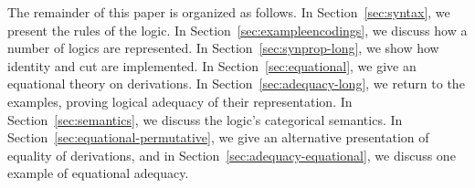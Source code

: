 
The remainder of this paper is organized as follows.  In
Section~\ref{sec:syntax}, we present the rules of the logic.  In
Section~\ref{sec:exampleencodings}, we discuss how a number of logics
are represented.  In Section~\ref{sec:synprop-long}, we show how
identity and cut are implemented.  In Section~\ref{sec:equational}, we
give an equational theory on derivations.  In
Section~\ref{sec:adequacy-long}, we return to the examples, proving
logical adequacy of their representation.  In
Section~\ref{sec:semantics}, we discuss the logic's categorical
semantics.  In Section~\ref{sec:equational-permutative}, we give an
alternative presentation of equality of derivations, and in
Section~\ref{sec:adequacy-equational}, we discuss one example of
equational adequacy.
